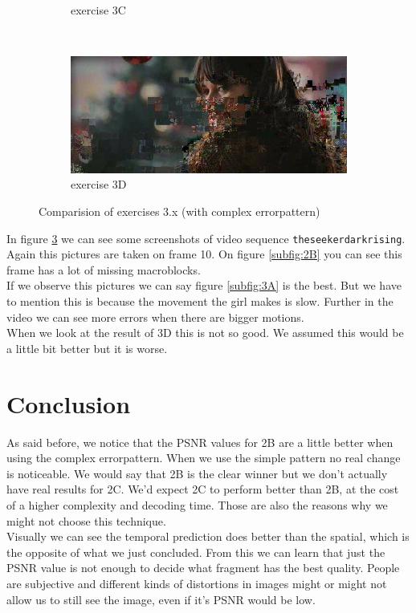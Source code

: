 \documentclass[a4paper,11pt,oneside]{article}
\begin{document}
\begin{figure}[h]
\begin{subfigure}[h]{0.5\textwidth}
                \caption{exercise 3C}\label{subfig:3C}
        \end{subfigure}
        ~
        \begin{subfigure}[h]{0.5\textwidth}
                \includegraphics[width=\textwidth]{img/3D_complex.png}
                \caption{exercise 3D}\label{subfig:3D}
        \end{subfigure}
        \caption{Comparision of exercises 3.x (with complex errorpattern)}\label{fig:ex3x}
\end{figure}
\vspace{-0.5cm}
In figure \ref{fig:ex3x} we can see some screenshots of video sequence  \verb!theseekerdarkrising!. Again this pictures are taken on frame 10. On figure \ref{subfig:2B} you can see this frame has a lot of missing macroblocks.\\
If we observe this pictures we can say figure \ref{subfig:3A} is the best. But we have to mention this is because the movement the girl makes is slow. Further in the video we can see more errors when there are bigger motions.\\
When we look at the result of 3D this is not so good. We assumed this would be a little bit better but it is worse.

\section*{Conclusion}
\vspace{-0.5cm}
As said before, we notice that the PSNR values for 2B are a little better when using the complex errorpattern. When we use the simple pattern no real change is noticeable. We would say that 2B is the clear winner but we don't actually have real results for 2C. We'd expect 2C to perform better than 2B, at the cost of a higher complexity and decoding time. Those are also the reasons why we might not choose this technique.\\
Visually we can see the temporal prediction does better than the spatial, which is the opposite of what we just concluded. From this we can learn that just the PSNR value is not enough to decide what fragment has the best quality. People are subjective and different kinds of distortions in images might or might not allow us to still see the image, even if it's PSNR would be low.
\end{document}
